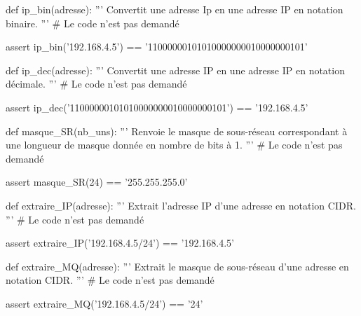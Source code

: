 \documentclass[a4paper,10pt]{report}
\begin{document}
   \begin{CodePythontexAlt}[TaillePolice=\large, Largeur=1\linewidth,Centre,Lignes=true,PremLigne=1]{}
def ip_bin(adresse):
    ''' Convertit une adresse Ip en une adresse IP en notation binaire. '''
    # Le code n'est pas demandé

assert ip_bin('192.168.4.5') == '11000000101010000000010000000101'

def ip_dec(adresse):
    ''' Convertit une adresse IP en une adresse IP en notation décimale. '''
    # Le code n'est pas demandé

assert ip_dec('11000000101010000000010000000101') == '192.168.4.5'

def masque_SR(nb_uns):
    ''' Renvoie le masque de sous-réseau correspondant 
    à une longueur de masque donnée en nombre de bits à 1. '''
    # Le code n'est pas demandé
    
assert masque_SR(24) == '255.255.255.0'

def extraire_IP(adresse):
    ''' Extrait l'adresse IP d'une adresse en notation CIDR. '''        
    # Le code n'est pas demandé

assert extraire_IP('192.168.4.5/24') == '192.168.4.5'

def extraire_MQ(adresse):
    ''' Extrait le masque de sous-réseau d'une adresse en notation CIDR. '''
    # Le code n'est pas demandé

assert extraire_MQ('192.168.4.5/24') == '24'
   \end{CodePythontexAlt}


   \pagebreak
   \thispagestyle{DS_LP}
\end{document}
